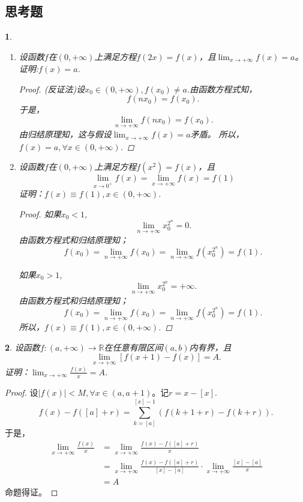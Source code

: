 \documentclass[utf8]{book}
\newtheorem{example}{}[section]             %
\begin{document}
\subsection{思考题}
\begin{example}
\renewcommand\labelenumi{\normalfont(\theenumi)}
\begin{enumerate}
\item 设函数$f$在$(0,+\infty)$上满足方程$f(2x)=f(x)$，且$\displaystyle\lim_{x\to +\infty}f(x)=a$。证明:$f(x)=a$.
\begin{proof}(反证法)设$x_0\in (0,+\infty), f(x_0) \neq a$.由函数方程式知，
$$f(nx_0) = f(x_0).$$
于是，$$\displaystyle\lim_{n\to +\infty}f(nx_0)=f(x_0).$$
由归结原理知，这与假设$\displaystyle\lim_{x\to +\infty}f(x)=a$矛盾。
所以，$f(x)=a,\forall x\in(0,+\infty)$.
\end{proof}
\item 设函数$f$在$(0,+\infty)$上满足方程$f(x^2)=f(x)$，且$$\displaystyle\lim_{x\to 0^+}f(x)=\displaystyle\lim_{x\to +\infty}f(x)=f(1)$$证明：$f(x)\equiv f(1), x\in (0,+\infty)$.
\begin{proof}
如果$x_0<1$, $$\displaystyle\lim_{n\to +\infty}x_0^{2^n}=0.$$
由函数方程式和归结原理知；
$$f(x_0) = \displaystyle\lim_{n\to +\infty}f(x_0) = \displaystyle\lim_{n\to +\infty}f(x_0^{2^n})=f(1).$$

如果$x_0>1$, $$\displaystyle\lim_{n\to +\infty}x_0^{2^n}=+\infty.$$
由函数方程式和归结原理知；
$$f(x_0) = \displaystyle\lim_{n\to +\infty}f(x_0) = \displaystyle\lim_{n\to +\infty}f(x_0^{2^n})=f(1).$$
所以，$f(x)\equiv f(1), x\in(0,+\infty)$.
\end{proof}
\end{enumerate}
\end{example}
\begin{example}
设函数$f:(a, +\infty)\rightarrow \mathbb{R}$在任意有限区间$(a,b)$内有界，且$$\displaystyle\lim_{x\to +\infty}[f(x+1)-f(x)]=A.$$证明：$\displaystyle\lim_{x\to +\infty}\frac{f(x)}{x}=A$.
\end{example}
\begin{proof}设$|f(x)|< M, \forall x\in(a,a+1)$。记$r=x-[x]$.
$$f(x) - f([a] + r) = \displaystyle\sum_{k=[a]}^{[x]-1}(f(k+1+r)-f(k+r)).$$
于是，
\begin{equation*}
\begin{split}
\displaystyle\lim_{x\to +\infty}\frac{f(x)}{x} &= \displaystyle\lim_{x\to +\infty}\frac{f(x)-f([a]+r)}{x}\\&=\displaystyle\lim_{x\to +\infty}\frac{f(x)-f([a]+r)}{[x]-[a]}\cdot\displaystyle\lim_{x\to +\infty}\frac{[x]-[a]}{x} \\&= 
A
\end{split}
\end{equation*}
命题得证。
\end{proof}
\end{document}
